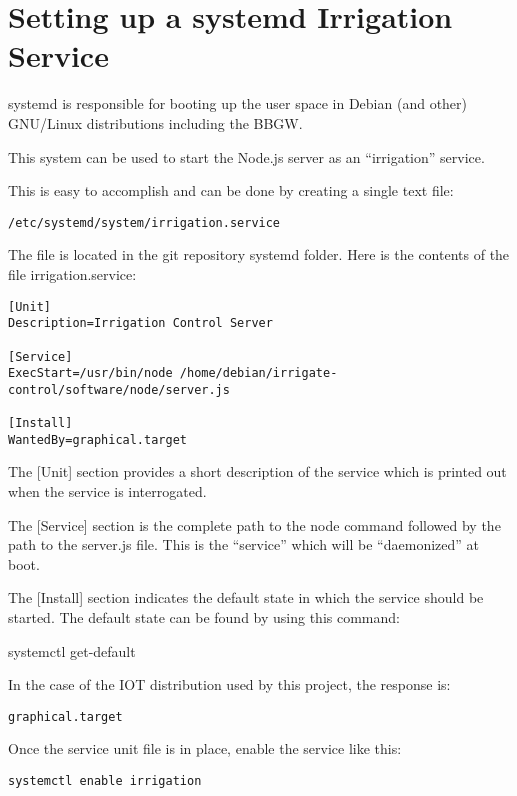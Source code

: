 \chapter{Setting up a systemd Irrigation Service}

systemd is responsible for booting up the user space in Debian (and other) 
GNU/Linux distributions including the BBGW.

This system can be used to start the Node.js server as an ``irrigation'' 
service.

This is easy to accomplish and can be done by creating a single text file:

\begin{verbatim}
/etc/systemd/system/irrigation.service
\end{verbatim}

The file is located in the git repository systemd folder.
Here is the contents of the file irrigation.service:

\begin{verbatim}
[Unit]
Description=Irrigation Control Server

[Service]
ExecStart=/usr/bin/node /home/debian/irrigate-control/software/node/server.js

[Install]
WantedBy=graphical.target
\end{verbatim}

The [Unit] section provides a short description of the service which is printed 
out when the service is interrogated.

The [Service] section is the complete path to the node command followed by the 
path to the server.js file.  This is the ``service'' which will be 
``daemonized'' at boot.

The [Install] section indicates the default state in which the service should 
be started.  The default state can be found by using this command:

systemctl get-default

In the case of the IOT distribution used by this project, the response is:

\begin{verbatim}
graphical.target
\end{verbatim}

Once the service unit file is in place, enable the service like this:

\begin{verbatim}
systemctl enable irrigation
\end{verbatim}


